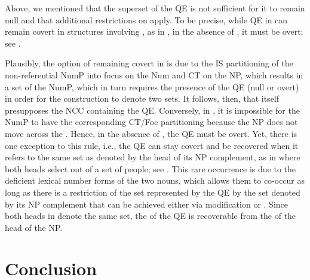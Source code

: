 \documentclass[output=paper,modfonts,newtxmath,hidelinks]{langscibook}
\begin{document}
Above, we mentioned that the superset  of the QE is not sufficient for it to remain null and that additional restrictions on  apply. To be precise, while QE in  can remain covert in structures involving  , as in , in the absence of , it must be overt; see . 
\ea \label{18:ex34}
	\z
    
\z 

\noindent Plausibly, the option of remaining covert in  is due to the IS partitioning of the non-referential NumP into focus on the Num and CT on the NP, which results in a set   of the NumP, which in turn requires the presence of the QE (null or overt) in order for the  construction to denote two sets. It follows, then, that   itself presupposes the NCC containing the QE. Conversely, in , it is impossible for the NumP to have the corresponding CT/Foc partitioning because the NP does not move across the  \citep{Titov2013}. Hence, in the absence of  , the QE must be overt. Yet, there is one exception to this rule, i.e., the QE can stay covert and be recovered when it refers to the same set as denoted by the head of its NP\textsubscript{} complement, as in  where both heads select out of a set of people; see . This rare occurrence is due to the deficient lexical number forms of the two nouns, which allows them to co-occur as long as there is a restriction of the set represented by the QE by the set denoted by its NP complement that can be achieved either via modification or . Since both heads in  denote the same set, the  of the QE is recoverable from the  of the head of the NP.\textsubscript{} 

\section{Conclusion}\label{18:s5}
\end{document}

